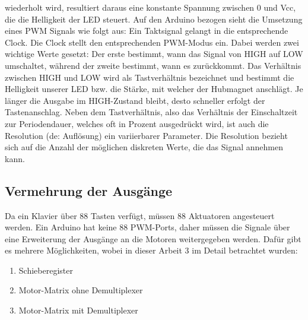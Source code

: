 wiederholt wird, resultiert daraus eine konstante Spannung zwischen 0 und Vcc, die die Helligkeit
der LED steuert. \newline
Auf den Arduino bezogen sieht die Umsetzung eines PWM Signals wie folgt aus:
Ein Taktsignal gelangt in die entsprechende Clock.
Die Clock stellt den entsprechenden PWM-Modus ein. Dabei werden zwei wichtige Werte gesetzt:
Der erste bestimmt, wann das Signal von HIGH auf LOW
umschaltet, während der zweite bestimmt, wann es zurückkommt. Das Verhältnis zwischen HIGH und LOW wird als
Tastverhältnis bezeichnet und bestimmt die Helligkeit unserer LED bzw. die Stärke, mit welcher der Hubmagnet anschlägt.
Je länger die Ausgabe im HIGH-Zustand bleibt, desto schneller erfolgt der Tastenanschlag. \newline
Neben dem Tastverhältnis, also das Verhältnis der Einschaltzeit zur
Periodendauer, welches oft in Prozent ausgedrückt wird, ist auch die Resolution (de: Auflösung) ein variierbarer Parameter.
Die Resolution bezieht sich auf die Anzahl der möglichen diskreten Werte, die das Signal annehmen kann.


\subsection{Vermehrung der Ausgänge}\label{output}
Da ein Klavier über 88 Tasten verfügt, müssen 88 Aktuatoren angesteuert werden. Ein Arduino hat keine 88 PWM-Ports, daher
müssen die Signale über eine Erweiterung der Ausgänge an die Motoren weitergegeben werden. Dafür gibt es mehrere Möglichkeiten,
wobei in dieser Arbeit 3 im Detail betrachtet wurden:

\begin{enumerate}
	\item Schieberegister
	\item Motor-Matrix ohne Demultiplexer
	\item Motor-Matrix mit Demultiplexer
\end{enumerate}


